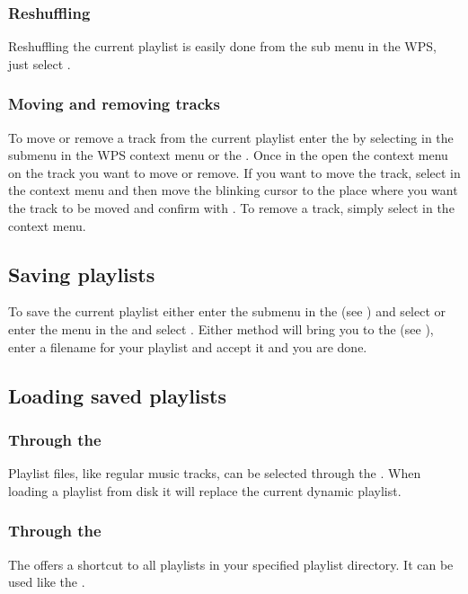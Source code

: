 \subsubsection{Reshuffling}
Reshuffling the current playlist is easily done from the 
sub menu in the WPS, just select .

\subsubsection{Moving and removing tracks}
To move or remove a track from the current playlist enter the
 by selecting  in the
 submenu in the WPS context menu or the .
Once in the  open the context menu on the track you
want to move or remove. If you want to move the track, select  in
the context menu and then move the blinking cursor to the place where you want
the track to be moved and confirm with \ActionStdOk. To remove a track, simply
select  in the context menu.

\subsection{Saving playlists}
To save the current playlist either enter the  submenu
in the  (see ) and
select  or enter the
 menu in the  and select
.
Either method will bring you to the  (see
), enter a filename for your playlist and
accept it and you are done.

\subsection{Loading saved playlists}
\subsubsection{Through the }
Playlist files, like regular music tracks, can be selected through the
. When loading a playlist from disk it will replace
the current dynamic playlist.

\subsubsection{Through the }
The  offers a shortcut to all playlists in your
\daps{} specified playlist directory.
It can be used like the .

